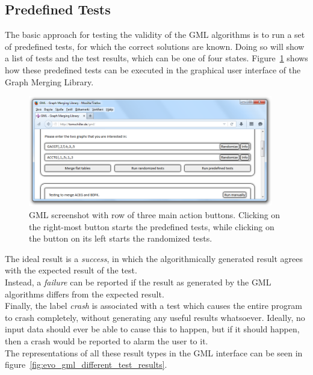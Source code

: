 \documentclass[a4paper,12pt,twoside,BCOR=10mm]{scrbook}
\begin{document}
\subsection{Predefined Tests}

The basic approach for testing the validity of the GML algorithms is to run a set 
of predefined tests, for which the correct solutions are known. Doing so will 
show a list of tests and the test results, which can be one of four states. 
Figure~\ref{fig:evo_gml_test_buttons} shows how these predefined tests can be executed in the graphical user interface 
of the Graph Merging Library. \\
\begin{figure}[!htb]
\centering
\includegraphics[width=0.95\textwidth]{evo_gml_test_buttons.png}
\caption[GML Test Execution]{GML screenshot with row of three main action buttons. Clicking on the right-most button starts the predefined tests, while clicking on the button on its left starts the randomized tests.} \label{fig:evo_gml_test_buttons}
\end{figure}
The ideal result is a \textit{success}, in which the algorithmically generated result agrees with the 
expected result of the test. \\
Instead, a \textit{failure} can be reported if the result as generated by the GML algorithms 
differs from the expected result. \\
Finally, the label \textit{crash} is associated with a test which causes the 
entire program to crash completely, without generating any useful results whatsoever. 
Ideally, no input data should ever be able to cause this to happen, 
but if it should happen, then a crash would be reported to alarm the user to it. \\
The representations of all these result types in the GML interface can be seen in figure~\ref{fig:evo_gml_different_test_results}. 
\end{document}
